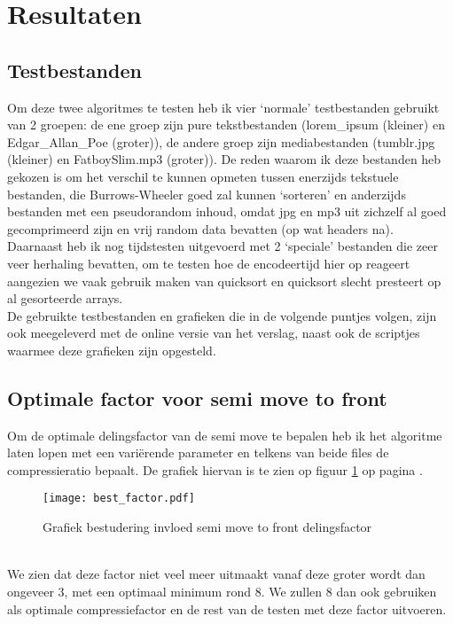 \documentclass[11pt,a4paper]{article}
\begin{document}
\section{Resultaten}
\subsection{Testbestanden}
Om deze twee algoritmes te testen heb ik vier `normale' testbestanden gebruikt van 2 groepen: de ene groep zijn pure tekstbestanden (lorem\_ipsum (kleiner) en Edgar\_Allan\_Poe (groter)), de andere groep zijn mediabestanden (tumblr.jpg (kleiner) en FatboySlim.mp3 (groter)). De reden waarom ik deze bestanden heb gekozen is om het verschil te kunnen opmeten tussen enerzijds tekstuele bestanden, die Burrows-Wheeler goed zal kunnen `sorteren' en anderzijds bestanden met een pseudorandom inhoud, omdat jpg en mp3 uit zichzelf al goed gecomprimeerd zijn en vrij random data bevatten (op wat headers na).\\
Daarnaast heb ik nog tijdstesten uitgevoerd met 2 `speciale' bestanden die zeer veer herhaling bevatten, om te testen hoe de encodeertijd hier op reageert aangezien we vaak gebruik maken van quicksort en quicksort slecht presteert op al gesorteerde arrays.\\
De gebruikte testbestanden en grafieken die in de volgende puntjes volgen, zijn ook meegeleverd met de online versie van het verslag, naast ook de scriptjes waarmee deze grafieken zijn opgesteld.

\subsection{Optimale factor voor semi move to front}
\label{smtf}
Om de optimale delingsfactor van de semi move te bepalen heb ik het algoritme laten lopen met een vari\"erende parameter en telkens van beide files de compressieratio bepaalt. De grafiek hiervan is te zien op figuur \ref{gsmtf} op pagina \pageref{gsmtf}.
\begin{figure}[h!]
  \centering
    \texttt{[image: best\_factor.pdf]}
    \caption{Grafiek bestudering invloed semi move to front delingsfactor}
  \label{gsmtf}
\end{figure}
\\We zien dat deze factor niet veel meer uitmaakt vanaf deze groter wordt dan ongeveer 3, met een optimaal minimum rond 8. We zullen 8 dan ook gebruiken als optimale compressiefactor en de rest van de testen met deze factor uitvoeren.
\end{document}
